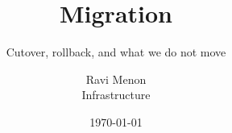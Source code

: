 \documentclass[aspectratio=169,11pt]{beamer}
\title{Migration}
\subtitle{Cutover, rollback, and what we do not move}
\author{Ravi Menon \\ \small Infrastructure}
\date{\today}
\begin{document}
\titleslide





\end{document}
